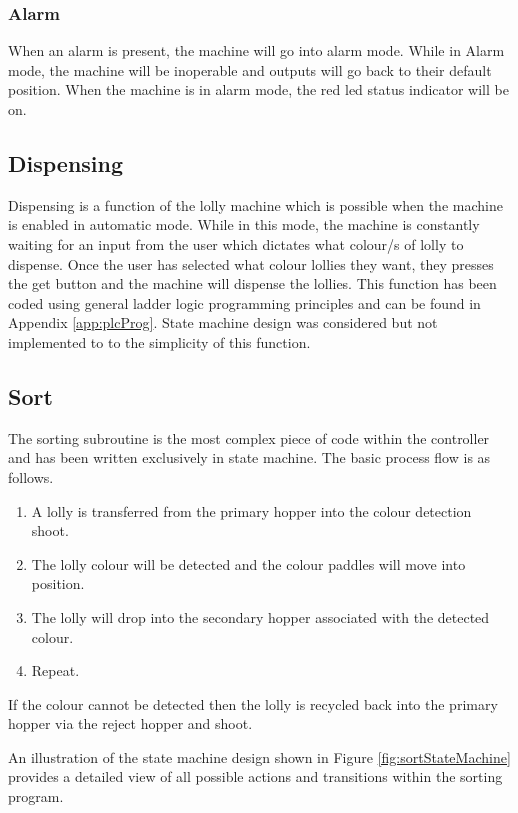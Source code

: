         \subsubsection{Alarm}
            When an alarm is present, the machine will go into alarm mode. While in Alarm mode, the machine will be inoperable and outputs will go back to their default position. When the machine is in alarm mode, the red \acrshort{led} status indicator will be on.

    \subsection{Dispensing}
        Dispensing is a function of the lolly machine which is possible when the machine is enabled in automatic mode. While in this mode, the machine is constantly waiting for an input from the user which dictates what colour/s of lolly to dispense. Once the user has selected what colour lollies they want, they presses the get button and the machine will dispense the lollies. This function has been coded using general ladder logic programming principles and can be found in Appendix \ref{app:plcProg}. State machine design was considered but not implemented to to the simplicity of this function. 
        
    \subsection{Sort}
        The sorting subroutine is the most complex piece of code within the controller and has been written exclusively in state machine. The basic process flow is as follows. 

        \begin{enumerate}
            \item A lolly is transferred from the primary hopper into the colour detection shoot.
            \item The lolly colour will be detected and the colour paddles will move into position.
            \item The lolly will drop into the secondary hopper associated with the detected colour.
            \item Repeat.
        \end{enumerate}

        If the colour cannot be detected then the lolly is recycled back into the primary hopper via the reject hopper and shoot. 

        An illustration of the state machine design shown in Figure \ref{fig:sortStateMachine} provides a detailed view of all possible actions and transitions within the sorting program.


